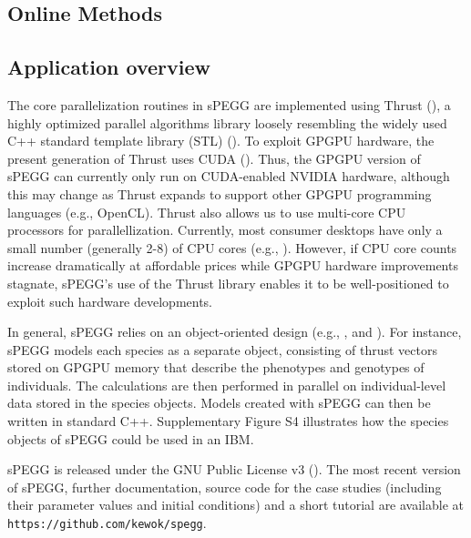 \documentclass[1p,numbered]{article}
\begin{document}
\begin{linenumbers}

\section*{Online Methods}
\subsection*{Application overview}
The core parallelization routines in sPEGG are implemented using Thrust (\citealt{thrust}), a highly optimized parallel algorithms library loosely resembling the widely used C++ standard template library (STL) (\citealt{stl}). To exploit GPGPU hardware, the present generation of Thrust uses CUDA (\citealt{nickolls08}). Thus, the GPGPU version of sPEGG can currently only run on CUDA-enabled NVIDIA hardware, although this may change as Thrust expands to support other GPGPU programming languages (e.g., OpenCL). Thrust also allows us to use multi-core CPU processors for parallellization. Currently, most consumer desktops have only a small number (generally 2-8) of CPU cores (e.g., \citealt{hruska12}). However, if CPU core counts increase dramatically at affordable prices while GPGPU hardware improvements stagnate, sPEGG's use of the Thrust library enables it to be well-positioned to exploit such hardware developments. 

In general, sPEGG relies on an object-oriented design (e.g., \citealt{booch82}, \citealt{rumbaugh90} and \citealt{martin02}). For instance, sPEGG models each species as a separate object, consisting of thrust vectors stored on GPGPU memory that describe the phenotypes and genotypes of individuals. The calculations are then performed in parallel on individual-level data stored in the species objects. Models created with sPEGG can then be written in standard C++. Supplementary Figure S4 illustrates how the species objects of sPEGG could be used in an IBM. 

sPEGG is released under the GNU Public License v3 (\citealt{gpl3}). The most recent version of sPEGG, further documentation, source code for the case studies (including their parameter values and initial conditions) and a short tutorial are available at \nolinkurl{https://github.com/kewok/spegg}.


\end{linenumbers}
\end{document}
